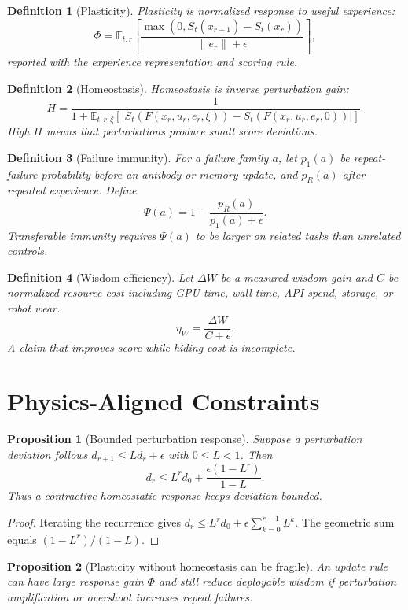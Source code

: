 \documentclass[11pt]{article}
\newtheorem{definition}{Definition}
\newtheorem{proposition}{Proposition}
\begin{document}
\begin{definition}[Plasticity]
Plasticity is normalized response to useful experience:
\[
\Phi=\mathbb{E}_{t,r}\left[
\frac{\max(0,S_t(x_{r+1})-S_t(x_r))}{\|e_r\|+\epsilon}
\right],
\]
reported with the experience representation and scoring rule.
\end{definition}

\begin{definition}[Homeostasis]
Homeostasis is inverse perturbation gain:
\[
H=\frac{1}{1+\mathbb{E}_{t,r,\xi}\left[|S_t(F(x_r,u_r,e_r,\xi))-S_t(F(x_r,u_r,e_r,0))|\right]}.
\]
High $H$ means that perturbations produce small score deviations.
\end{definition}

\begin{definition}[Failure immunity]
For a failure family $a$, let $p_1(a)$ be repeat-failure probability before an antibody or memory update, and $p_R(a)$ after repeated experience.
Define
\[
\Psi(a)=1-\frac{p_R(a)}{p_1(a)+\epsilon}.
\]
Transferable immunity requires $\Psi(a)$ to be larger on related tasks than unrelated controls.
\end{definition}

\begin{definition}[Wisdom efficiency]
Let $\Delta W$ be a measured wisdom gain and $C$ be normalized resource cost including GPU time, wall time, API spend, storage, or robot wear.
\[
\eta_W=\frac{\Delta W}{C+\epsilon}.
\]
A claim that improves score while hiding cost is incomplete.
\end{definition}

\section{Physics-Aligned Constraints}

\begin{proposition}[Bounded perturbation response]
Suppose a perturbation deviation follows $d_{r+1}\le Ld_r+\epsilon$ with $0\le L<1$.
Then
\[
d_r\le L^r d_0+\frac{\epsilon(1-L^r)}{1-L}.
\]
Thus a contractive homeostatic response keeps deviation bounded.
\end{proposition}

\begin{proof}
Iterating the recurrence gives
$d_r\le L^r d_0+\epsilon\sum_{k=0}^{r-1}L^k$.
The geometric sum equals $(1-L^r)/(1-L)$.
\end{proof}

\begin{proposition}[Plasticity without homeostasis can be fragile]
An update rule can have large response gain $\Phi$ and still reduce deployable wisdom if perturbation amplification or overshoot increases repeat failures.
\end{proposition}
\end{document}
